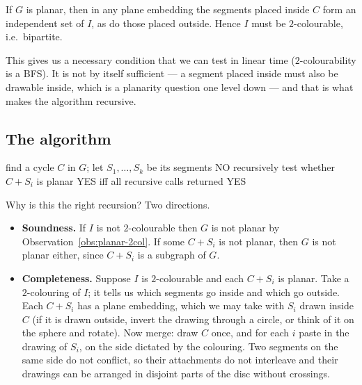 \begin{observation}\label{obs:planar-2col}
If $G$ is planar, then in any plane embedding the segments placed inside $C$
form an independent set of $I$, as do those placed outside. Hence $I$ must be
$2$-colourable, i.e.\ bipartite.
\end{observation}

This gives us a necessary condition that we can test in linear time
($2$-colourability is a BFS). It is not by itself sufficient --- a segment
placed inside must also be drawable inside, which is a planarity question one
level down --- and that is what makes the algorithm recursive.

\subsection{The algorithm}

\begin{algorithm}[ht]
\caption{Planarity test (first attempt)}
\label{alg:planar-naive}
\begin{algorithmic}[1]
  \State find a cycle $C$ in $G$; let $S_1,\dots,S_k$ be its segments
    \State \Return NO
  \EndIf
    \State recursively test whether $C + S_i$ is planar
  \EndFor
  \State \Return YES iff all recursive calls returned YES
\end{algorithmic}
\end{algorithm}

Why is this the right recursion? Two directions.

\begin{itemize}
  \item \textbf{Soundness.} If $I$ is not $2$-colourable then $G$ is not planar
        by Observation~\ref{obs:planar-2col}. If some $C + S_i$ is not planar, then
        $G$ is not planar either, since $C + S_i$ is a subgraph of $G$.
  \item \textbf{Completeness.} Suppose $I$ is $2$-colourable and each
        $C + S_i$ is planar. Take a $2$-colouring of $I$; it tells us which
        segments go inside and which go outside. Each $C + S_i$ has a plane
        embedding, which we may take with $S_i$ drawn inside $C$ (if it is
        drawn outside, invert the drawing through a circle, or think of it on
        the sphere and rotate). Now merge: draw $C$ once, and for each $i$ paste
        in the drawing of $S_i$, on the side dictated by the colouring. Two
        segments on the same side do not conflict, so their attachments do not
        interleave and their drawings can be arranged in disjoint parts of the
        disc without crossings.
\end{itemize}

